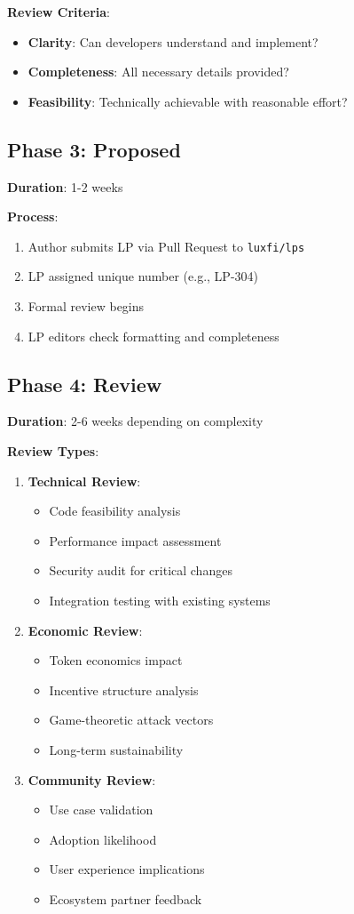 \documentclass[11pt,a4paper]{article}
\begin{document}
\textbf{Review Criteria}:
\begin{itemize}
\item \textbf{Clarity}: Can developers understand and implement?
\item \textbf{Completeness}: All necessary details provided?
\item \textbf{Feasibility}: Technically achievable with reasonable effort?
\end{itemize}

\subsection{Phase 3: Proposed}

\textbf{Duration}: 1-2 weeks

\textbf{Process}:
\begin{enumerate}
\item Author submits LP via Pull Request to \texttt{luxfi/lps}
\item LP assigned unique number (e.g., LP-304)
\item Formal review begins
\item LP editors check formatting and completeness
\end{enumerate}

\subsection{Phase 4: Review}

\textbf{Duration}: 2-6 weeks depending on complexity

\textbf{Review Types}:

\begin{enumerate}
\item \textbf{Technical Review}:
\begin{itemize}
\item Code feasibility analysis
\item Performance impact assessment
\item Security audit for critical changes
\item Integration testing with existing systems
\end{itemize}

\item \textbf{Economic Review}:
\begin{itemize}
\item Token economics impact
\item Incentive structure analysis
\item Game-theoretic attack vectors
\item Long-term sustainability
\end{itemize}

\item \textbf{Community Review}:
\begin{itemize}
\item Use case validation
\item Adoption likelihood
\item User experience implications
\item Ecosystem partner feedback
\end{itemize}
\end{enumerate}
\end{document}
